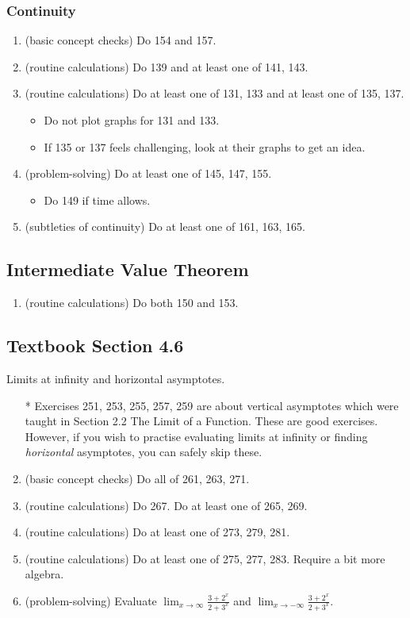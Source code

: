 \documentclass[../main.tex]{subfiles}
\begin{document}
\subsubsection*{Continuity}
\begin{enumerate}
  \item (basic concept checks) Do 154 and 157.
  \item (routine calculations) Do 139 and at least one of 141, 143.
  \item (routine calculations) Do at least one of 131, 133 and at least one of 135, 137.
    \begin{itemize}
      \item Do not plot graphs for 131 and 133. 
      \item If 135 or 137 feels challenging, look at their graphs to get an idea. 
    \end{itemize}
  \item (problem-solving) Do at least one of 145, 147, 155.
    \begin{itemize}
      \item Do 149 if time allows.
    \end{itemize}
  \item (subtleties of continuity) Do at least one of 161, 163, 165.
\end{enumerate}

\subsection*{Intermediate Value Theorem}
\begin{enumerate}
  \item (routine calculations) Do both 150 and 153.
\end{enumerate}

\clearpage
\subsection*{Textbook Section 4.6}

Limits at infinity and horizontal asymptotes.
\begin{enumerate}
  \item[*] Exercises 251, 253, 255, 257, 259 are about vertical asymptotes which were taught in Section 2.2 The Limit of a Function. These are good exercises. However, if you wish to practise evaluating limits at infinity or finding \emph{horizontal} asymptotes, you can safely skip these.
  \item (basic concept checks) Do all of 261, 263, 271.
  \item (routine calculations) Do 267. Do at least one of 265, 269. 
  \item (routine calculations) Do at least one of 273, 279, 281.
  \item (routine calculations) Do at least one of 275, 277, 283. Require a bit more algebra.
  \item (problem-solving) Evaluate \(\lim_{x \to \infty} \frac{3 + 2^{x}}{2 + 3^{x}}\) and \(\lim_{x \to -\infty} \frac{3 + 2^{x}}{2 + 3^{x}}\).
\end{enumerate}
\end{document}
